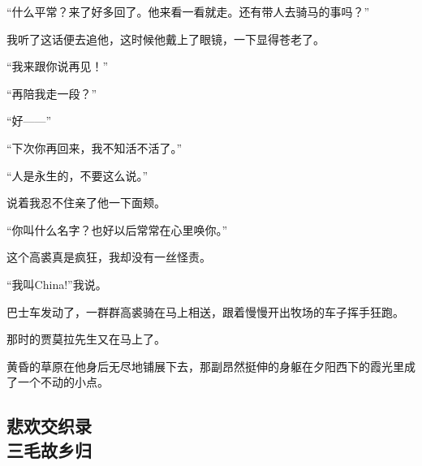 \par “什么平常？来了好多回了。他来看一看就走。还有带人去骑马的事吗？”
\par 我听了这话便去追他，这时候他戴上了眼镜，一下显得苍老了。
\par “我来跟你说再见！”
\par “再陪我走一段？”
\par “好——”
\par “下次你再回来，我不知活不活了。”
\par “人是永生的，不要这么说。”
\par 说着我忍不住亲了他一下面颊。
\par “你叫什么名字？也好以后常常在心里唤你。”
\par 这个高裘真是疯狂，我却没有一丝怪责。
\par “我叫China!”我说。
\par 巴士车发动了，一群群高裘骑在马上相送，跟着慢慢开出牧场的车子挥手狂跑。
\par 那时的贾莫拉先生又在马上了。
\par 黄昏的草原在他身后无尽地铺展下去，那副昂然挺伸的身躯在夕阳西下的霞光里成了一个不动的小点。

























\subsection{悲欢交织录\\\small{三毛故乡归}}

